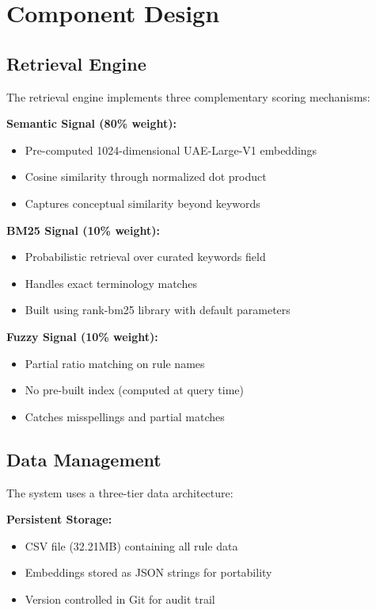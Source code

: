 \section{Component Design}

\subsection{Retrieval Engine}

The retrieval engine implements three complementary scoring mechanisms:

\textbf{Semantic Signal (80\% weight):}
\begin{itemize}[leftmargin=*,itemsep=2pt,topsep=2pt]
  \item Pre-computed 1024-dimensional UAE-Large-V1 embeddings
  \item Cosine similarity through normalized dot product
  \item Captures conceptual similarity beyond keywords
\end{itemize}

\textbf{BM25 Signal (10\% weight):}
\begin{itemize}[leftmargin=*,itemsep=2pt,topsep=2pt]
  \item Probabilistic retrieval over curated keywords field
  \item Handles exact terminology matches
  \item Built using rank-bm25 library with default parameters
\end{itemize}

\textbf{Fuzzy Signal (10\% weight):}
\begin{itemize}[leftmargin=*,itemsep=2pt,topsep=2pt]
  \item Partial ratio matching on rule names
  \item No pre-built index (computed at query time)
  \item Catches misspellings and partial matches
\end{itemize}

\subsection{Data Management}

The system uses a three-tier data architecture:

\textbf{Persistent Storage:}
\begin{itemize}[leftmargin=*,itemsep=2pt,topsep=2pt]
  \item CSV file (32.21MB) containing all rule data
  \item Embeddings stored as JSON strings for portability
  \item Version controlled in Git for audit trail
\end{itemize}

